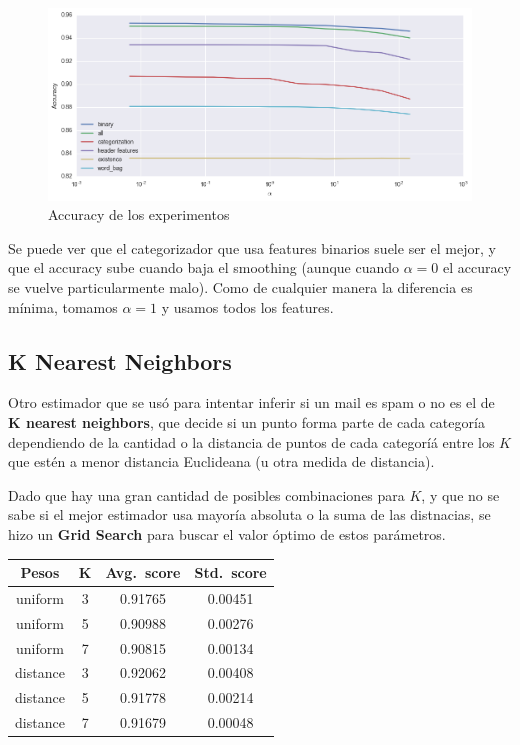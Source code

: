 \documentclass{article}
\begin{document}
\begin{figure}
	\centerline{\includegraphics[width=1.3\textwidth]{figures/bayes.png}}
	\caption{Accuracy de los experimentos}
\end{figure}

Se puede ver que el categorizador que usa features binarios suele ser el mejor, y que el accuracy sube cuando baja el smoothing (aunque cuando \( \alpha = 0 \) el accuracy se vuelve particularmente malo). Como de cualquier manera la diferencia es mínima, tomamos \( \alpha = 1 \) y usamos todos los features.

\subsection{K Nearest Neighbors}

Otro estimador que se usó para intentar inferir si un mail es spam o no es el de \textbf{K nearest neighbors}, que decide si un punto forma parte de cada categoría dependiendo de la cantidad o la distancia de puntos de cada categoríá entre los \( K \) que estén a menor distancia Euclideana (u otra medida de distancia).

Dado que hay una gran cantidad de posibles combinaciones para \( K \), y que no se sabe si el mejor estimador usa mayoría absoluta o la suma de las distnacias, se hizo un \textbf{Grid Search} para buscar el valor óptimo de estos parámetros.

\begin{center}
\begin{tabular}{c c c c}
	\toprule
	\textbf{Pesos} & \textbf{K} & \textbf{Avg.\ score} & \textbf{Std.\ score} \\
	\midrule
	uniform & 3 & 0.91765 & 0.00451 \\
	uniform & 5 & 0.90988 & 0.00276 \\
	uniform & 7 & 0.90815 & 0.00134 \\
	distance & 3 & 0.92062 & 0.00408 \\
	distance & 5 & 0.91778 & 0.00214 \\
	distance & 7 & 0.91679 & 0.00048 \\
	\bottomrule
\end{tabular}
\end{center}
\end{document}
